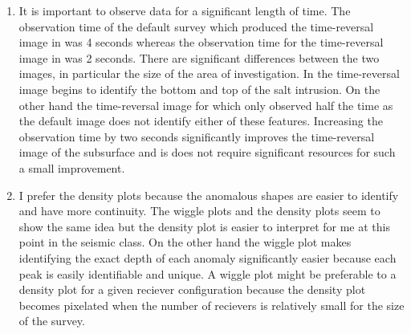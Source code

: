 \begin{enumerate}
\item It is important to observe data for a significant length of time. The observation time of the default survey which produced the time-reversal image in  was 4 seconds whereas the observation time for the time-reversal image in  was 2 seconds. There are significant differences between the two images, in particular the size of the area of investigation. In  the time-reversal image begins to identify the bottom and top of the salt intrusion. On the other hand the time-reversal image for  which only observed half the time as the default image does not identify either of these features. Increasing the observation time by two seconds significantly improves the time-reversal image of the subsurface and is does not require significant resources for such a small improvement.

\item I prefer the density plots because the anomalous shapes are easier to identify and have more continuity. The wiggle plots and the density plots seem to show the same idea but the density plot is easier to interpret for me at this point in the seismic class. On the other hand the wiggle plot makes identifying the exact depth of each anomaly significantly easier because each peak is easily identifiable and unique. A wiggle plot might be preferable to a density plot for a given reciever configuration because the density plot becomes pixelated when the number of recievers is relatively small for the size of the survey.


\end{enumerate}
